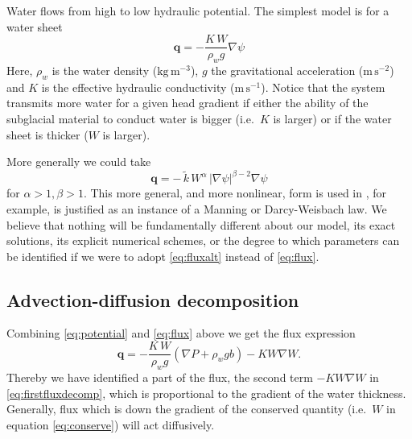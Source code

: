\documentclass[11pt,final]{amsart}%
\newcommand\bq{\mathbf{q}}
\newcommand{\grad}{\nabla}
\begin{document}
Water flows from high to low hydraulic potential.  The simplest model is for a water sheet \citep{Clarke05}
\begin{equation}  \label{eq:flux}
\bq = - \frac{K \, W}{\rho_w g} \grad \psi
\end{equation}
Here, $\rho_w$ is the water density ($\text{kg}\,\text{m}^{-3}$), $g$ the gravitational acceleration ($\text{m}\,\text{s}^{-2}$) and $K$ is the effective hydraulic conductivity ($\text{m}\,\text{s}^{-1}$).  Notice that the system transmits more water for a given head gradient if either the ability of the subglacial material to conduct water is bigger (i.e.~$K$ is larger) or if the water sheet is thicker ($W$ is larger).

More generally we could take
\begin{equation}  \label{eq:fluxalt}
\bq = - \,\tilde k\, W^\alpha\, |\grad \psi|^{\beta-2} \grad \psi
\end{equation}
for $\alpha>1,\beta>1$.  This more general, and more nonlinear, form is used in \cite{Hewittetal2012,Schoofetal2012}, for example, is justified as an instance of a Manning or Darcy-Weisbach law.  We believe that nothing will be fundamentally different about our model, its exact solutions, its explicit numerical schemes, or the degree to which parameters can be identified if we were to adopt \eqref{eq:fluxalt} instead of \eqref{eq:flux}.

\subsection*{Advection-diffusion decomposition}  Combining \eqref{eq:potential} and \eqref{eq:flux} above we get the flux expression
\begin{equation}
  \bq = - \frac{K\, W}{\rho_w g} \left(\grad P + \rho_w g b\right) - K W \grad W. \label{eq:firstfluxdecomp}
\end{equation}
Thereby we have identified a part of the flux, the second term $-K W \grad W$ in \eqref{eq:firstfluxdecomp}, which is proportional to the gradient of the water thickness.  Generally, flux which is down the gradient of the conserved quantity (i.e.~$W$ in equation \eqref{eq:conserve}) will act diffusively.
\end{document}
